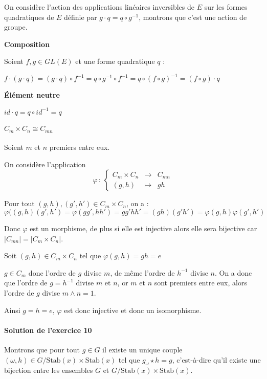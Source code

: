 \documentclass[]{article}
\theoremstyle{remark}
\theoremstyle{definition}
\newcommand{\func}[5]{
#1 \, : \, \left\{ \begin{array}{lcl}
	#2 & \longrightarrow & #3 \\
	#4 & \longmapsto & #5
\end{array}
\right.
}
\newenvironment{proofpart}[1]{
	\noindent
	{\textbf{\boldmath #1}}
}{
	\checkmark
}
\begin{document}
On considère l'action des applications linéaires inversibles de $E$ sur les formes quadratiques de $E$ définie par $g \cdot q = q \circ g^{-1}$, montrons que c'est une action de groupe.

\begin{proofpart}{Composition}

	Soient $f, g \in GL(E)$ et une forme quadratique $q$ :
	
	$f\cdot(g \cdot q)=(g \cdot q) \circ f^{-1}=q\circ g^{-1}\circ f^{-1}=q \circ (f \circ g)^{-1}=(f \circ g) \cdot q$
\end{proofpart}

\begin{proofpart}{Élément neutre}

	$id \cdot q = q \circ id^{-1} = q$
\end{proofpart}

\paragraph{\boldmath $C_m \times C_n \cong C_{mn}$} Soient $m$ et $n$ premiers entre eux.

On considère l'application
$$\func{\varphi}{C_m \times C_n}{C_{mn}}{(g,h)}{gh}$$

Pour tout $(g, h), (g', h') \in C_m \times C_n$, on a :  $$\varphi((g,h)(g',h')=\varphi(gg',hh')=gg'hh'=(gh)(g'h')=\varphi(g,h)\varphi(g',h')$$

Donc $\varphi$ est un morphisme, de plus si elle est injective alors elle sera bijective car $|C_{mn}| = |C_m \times C_n|$.

Soit $(g,h) \in C_m \times C_n$ tel que $\varphi(g, h) = gh = e$

$g \in C_m$ donc l'ordre de $g$ divise $m$, de même l'ordre de $h^{-1}$ divise $n$. On a donc que l'ordre de $g=h^{-1}$ divise $m$ et $n$, or $m$ et $n$ sont premiers entre eux, alors l'ordre de $g$ divise $m \land n = 1$.

Ainsi $g = h = e$, $\varphi$ est donc injective et donc un isomorphisme.

\paragraph{Solution de l'exercice 10}

Montrons que pour tout $g \in G$ il existe un unique couple $(\omega, h) \in G / \text{Stab}(x) \times \text{Stab}(x)$ tel que $g_\omega \star h = g$, c'est-à-dire qu'il existe une bijection entre les ensembles $G$ et $G/\text{Stab}(x) \times \text{Stab}(x)$.
\end{document}
